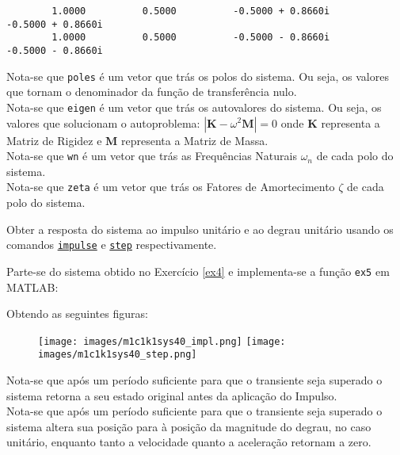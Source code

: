 \documentclass{article}
\begin{document}
\begin{resolution}
\begin{scriptsize}
\begin{lstlisting}
        1.0000          0.5000          -0.5000 + 0.8660i           -0.5000 + 0.8660i
        1.0000          0.5000          -0.5000 - 0.8660i           -0.5000 - 0.8660i
        \end{lstlisting}
    \end{scriptsize}
    Nota-se que \texttt{poles} é um vetor que trás os polos do sistema. Ou seja, os valores que tornam o denominador da função de transferência nulo.\\
    
    Nota-se que \texttt{eigen} é um vetor que trás os autovalores do sistema. Ou seja, os valores que solucionam o autoproblema: $|\mathbf{K} - \omega^2\mathbf{M}| = 0$ onde $\mathbf{K}$ representa a Matriz de Rigidez e $\mathbf{M}$ representa a Matriz de Massa.\\

    Nota-se que \texttt{wn} é um vetor que trás as Frequências Naturais $\omega_{n}$ de cada polo do sistema.\\

    Nota-se que \texttt{zeta} é um vetor que trás os Fatores de Amortecimento $\zeta$ de cada polo do sistema.
\end{resolution}

\newpage\begin{exercise}\label{ex5}
    Obter a resposta do sistema ao impulso unitário e ao degrau unitário usando os comandos \href{https://www.mathworks.com/help/control/ref/lti.impulse.html}{\texttt{impulse}} e \href{https://www.mathworks.com/help/control/ref/lti.step.html}{\texttt{step}} respectivamente.
\end{exercise}
\begin{resolution}
    Parte-se do sistema obtido no Exercício \ref{ex4} e implementa-se a função \texttt{ex5} em MATLAB:
    \begin{scriptsize}
        \myMatlab
    \end{scriptsize}
    Obtendo as seguintes figuras:
    \begin{figure}[H]
        \centering
        \texttt{[image: images/m1c1k1sys40\_impl.png]}
        \texttt{[image: images/m1c1k1sys40\_step.png]}
    \end{figure}
    Nota-se que após um período suficiente para que o transiente seja superado o sistema retorna a seu estado original antes da aplicação do Impulso.\\

    Nota-se que após um período suficiente para que o transiente seja superado o sistema altera sua posição para à posição da magnitude do degrau, no caso unitário, enquanto tanto a velocidade quanto a aceleração retornam a zero.
\end{resolution}
\end{document}
